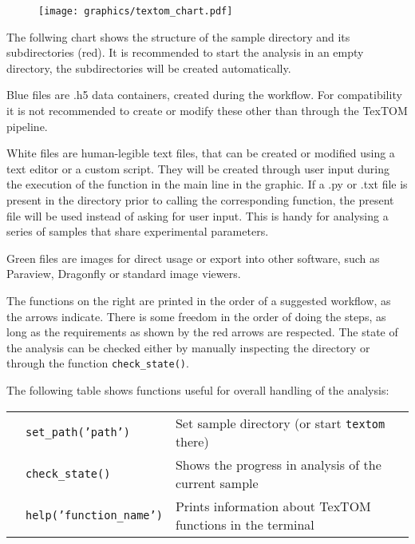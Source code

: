 \begin{figure}[h!]
    \texttt{[image: graphics/textom\_chart.pdf]}
    \centering
\end{figure}
The follwing chart shows the structure of the sample directory and its subdirectories (red).
It is recommended to start the analysis in an empty directory, the subdirectories will be
created automatically.

Blue files are .h5 data containers, created during the workflow. For compatibility it is not
recommended to create or modify these other than through the TexTOM pipeline.

White files are human-legible text files, that can be created or modified using a text editor or
a custom script. They will be created through user input during the execution of the function
in the main line in the graphic. 
If a .py or .txt file is present in the directory prior to calling the corresponding function,
the present file will be used instead of asking for user input. This is handy for analysing
a series of samples that share experimental parameters.

Green files are images for direct usage or export into other software, such as Paraview,
Dragonfly or standard image viewers.

The functions on the right are printed in the order of a suggested workflow, as the arrows indicate.
There is some freedom in the order of doing the steps, as long as the requirements as shown
by the red arrows are respected. The state of the analysis can be checked either by
manually inspecting the directory or through the function \texttt{check\_state()}.

The following table shows functions useful for overall handling of the analysis:
\begin{table}[h!]
    \centering
    \begin{tabular}{| l | l | l |} 
        \hline
         & \texttt{set\_path('path')} & Set sample directory (or start \texttt{textom} there)\\
         & \texttt{check\_state()} & Shows the progress in analysis of the current sample\\
         & \texttt{help('function\_name')} & Prints information about TexTOM functions in the terminal\\
      \hline
     \end{tabular}
\end{table}


\newpage
